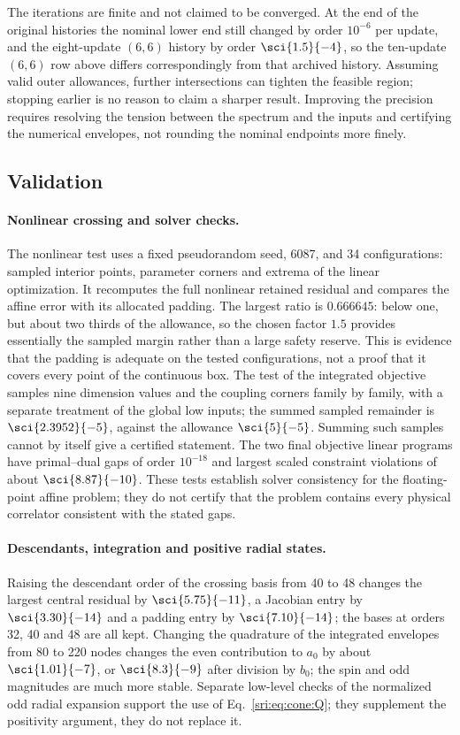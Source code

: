 The iterations are finite and not claimed to be converged. At the end of the original histories the nominal lower end
still changed by order $10^{-6}$ per update, and the eight-update $(6,6)$ history by order $\sci{1.5}{-4}$, so the
ten-update $(6,6)$ row above differs correspondingly from that archived history. Assuming valid outer allowances,
further intersections can tighten the feasible region; stopping earlier is no reason to claim a sharper result.
Improving the precision requires resolving the tension between the spectrum and the inputs and certifying the numerical
envelopes, not rounding the nominal endpoints more finely.

\subsection{Validation}\label{sri:app:cone:validation}
\paragraph{Nonlinear crossing and solver checks.} The nonlinear test uses a fixed pseudorandom seed, 6087, and 34
configurations: sampled interior points, parameter corners and extrema of the linear optimization. It recomputes the
full nonlinear retained residual and compares the affine error with its allocated padding. The largest ratio is
$0.666645$: below one, but about two thirds of the allowance, so the chosen factor $1.5$ provides essentially the
sampled margin rather than a large safety reserve. This is evidence that the padding is adequate on the tested
configurations, not a proof that it covers every point of the continuous box. The test of the integrated objective
samples nine dimension values and the coupling corners family by family, with a separate treatment of the global low
inputs; the summed sampled remainder is $\sci{2.3952}{-5}$, against the allowance $\sci{5}{-5}$. Summing such samples
cannot by itself give a certified statement. The two final objective linear programs have primal--dual gaps of order
$10^{-18}$ and largest scaled constraint violations of about $\sci{8.87}{-10}$. These tests establish solver
consistency for the floating-point affine problem; they do not certify that the problem contains every physical
correlator consistent with the stated gaps.

\paragraph{Descendants, integration and positive radial states.} Raising the descendant order of the crossing basis
from 40 to 48 changes the largest central residual by $\sci{5.75}{-11}$, a Jacobian entry by $\sci{3.30}{-14}$ and a
padding entry by $\sci{7.10}{-14}$; the bases at orders 32, 40 and 48 are all kept. Changing the quadrature of the
integrated envelopes from 80 to 220 nodes changes the even contribution to $a_0$ by about $\sci{1.01}{-7}$, or
$\sci{8.3}{-9}$ after division by $b_0$; the spin and odd magnitudes are much more stable. Separate low-level checks of the
normalized odd radial expansion support the use of Eq.~\eqref{sri:eq:cone:Q}; they supplement the positivity argument, they
do not replace it.

